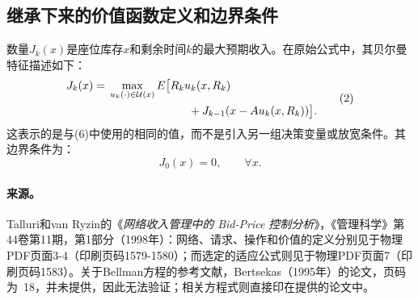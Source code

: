 \documentclass{article}
\begin{document}
\subsection*{继承下来的价值函数定义和边界条件}
数量$J_k(x)$是座位库存$x$和剩余时间$k$的最大预期收入。在原始公式中，其贝尔曼特征描述如下：
\begin{equation}
\begin{aligned}
J_k(x)={}&\max_{u_k(\cdot)\in\mathcal{U}(x)}
E\bigl[R_ku_k(x,R_k)\\
&\hspace{25mm}{}+J_{k-1}(x-Au_k(x,R_k))\bigr].
\end{aligned}\tag{2}
\end{equation}
这表示的是与(6)中使用的相同的值，而不是引入另一组决策变量或放宽条件。其边界条件为：
\begin{equation}
J_0(x)=0,\qquad\forall x.\tag{3}
\end{equation}

\paragraph{来源。}
Talluri和van Ryzin的《\emph{网络收入管理中的 Bid-Price 控制分析}》，《管理科学》第44卷第11期，第1部分（1998年）：网络、请求、操作和价值的定义分别见于物理PDF页面3-4（印刷页码1579-1580）；而选定的适应公式则见于物理PDF页面7（印刷页码1583）。关于Bellman方程的参考文献，Bertsekas（1995年）的论文，页码为~18，并未提供，因此无法验证；相关方程式则直接印在提供的论文中。
\end{document}
